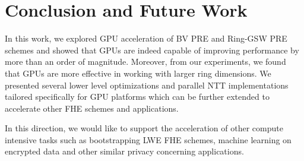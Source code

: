 \section{Conclusion and Future Work}

In this work, we explored GPU acceleration of BV PRE and Ring-GSW PRE schemes and showed that GPUs are indeed capable of improving performance by more than an order of magnitude. Moreover, from our experiments, we found that GPUs are more effective in working with larger ring dimensions. We presented several lower level optimizations and parallel NTT implementations tailored specifically for GPU platforms which can be further extended to accelerate other FHE schemes and applications. 

In this direction, we would like to support the acceleration of other compute intensive tasks such as bootstrapping LWE FHE schemes, machine learning on encrypted data and other similar privacy concerning applications. 